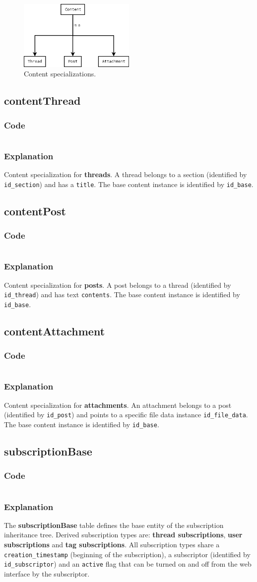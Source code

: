 \documentclass[12pt]{report}
\renewcommand\emph{\textbf}
\newcommand{\printSQLtest}[1]
{
    \inputminted[linenos, breaklines, breakbytoken, tabsize=4, fontsize=\footnotesize]{mysql}{#1}
}
\newcommand{\printSQLTablepage}[2]
{    
    \subsection{#2}
    \subsubsection{Code}
    \printSQLtest{../sql/parts/#1}
    \subsubsection{Explanation}
}
\begin{document}
                    \begin{figure}[!htb]
                    \caption{Content specializations.}
                    \centering
                    \includegraphics[width=0.5\textwidth]{td/07contentbase}
                    \end{figure}

                \newpage

                \printSQLTablepage{08_tblContentThread.sql}{contentThread}
                    Content specialization for \emph{threads}. A thread belongs to a section (identified by \texttt{id_section}) and has a \texttt{title}.
                    The base content instance is identified by \texttt{id_base}.

                \newpage

                \printSQLTablepage{09_tblContentPost.sql}{contentPost}
                    Content specialization for \emph{posts}. A post belongs to a thread (identified by \texttt{id_thread}) and has text \texttt{contents}.
                    The base content instance is identified by \texttt{id_base}.

                \newpage

                \printSQLTablepage{10_tblContentAttachment.sql}{contentAttachment}
                    Content specialization for \emph{attachments}. An attachment belongs to a post (identified by \texttt{id_post}) and points to a specific file data instance \texttt{id_file_data}.
                    The base content instance is identified by \texttt{id_base}.

                \newpage

                \printSQLTablepage{11_tblSubscriptionBase.sql}{subscriptionBase}
                    The \emph{subscriptionBase} table defines the base entity of the subscription inheritance tree. Derived subscription types are: \emph{thread subscriptions}, \emph{user subscriptions} and \emph{tag subscriptions}.
                    All subscription types share a \texttt{creation_timestamp} (beginning of the subscription), a subscriptor (identified by \texttt{id_subscriptor}) and an \texttt{active} flag that can be turned on and off from the web interface by the subscriptor.
\end{document}
